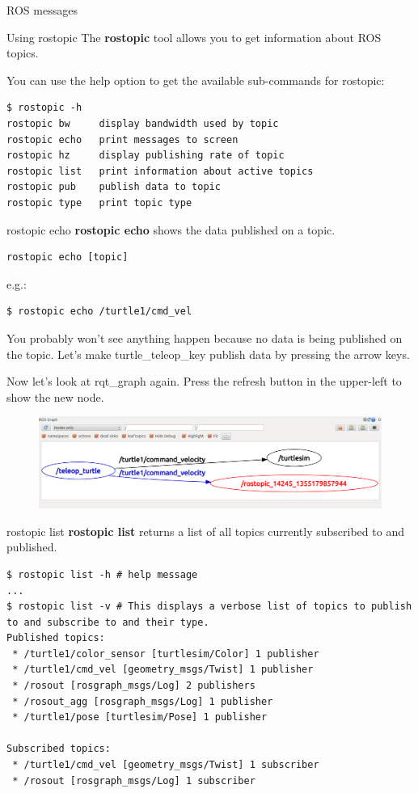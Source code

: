 \begin{frame}{ROS messages}
\end{frame}

\begin{frame}[fragile]{Using rostopic}
The \textbf{rostopic} tool allows you to get information about ROS topics. 

\vspace{.1cm}
You can use the help option to get the available sub-commands for rostopic:
\begin{lstlisting}[language=shell]
$ rostopic -h
rostopic bw     display bandwidth used by topic
rostopic echo   print messages to screen
rostopic hz     display publishing rate of topic    
rostopic list   print information about active topics
rostopic pub    publish data to topic
rostopic type   print topic type
\end{lstlisting}
\end{frame}

\begin{frame}[fragile]{rostopic echo}
\textbf{rostopic echo} shows the data published on a topic.
\begin{lstlisting}[language=syntax]
rostopic echo [topic]
\end{lstlisting}
e.g.:
\begin{lstlisting}[language=shell]
$ rostopic echo /turtle1/cmd_vel
\end{lstlisting}
You probably won't see anything happen because no data is being published on the topic. Let's make turtle\_teleop\_key publish data by pressing the arrow keys. 

\vspace{.1cm}
Now let's look at rqt\_graph again. Press the refresh button in the upper-left to show the new node.
\begin{figure}
\includegraphics[width=.8\textwidth]{./img/ros/rqt_graph_echo.png}
\end{figure}
\end{frame}

\begin{frame}[fragile]{rostopic list}
\textbf{rostopic list} returns a list of all topics currently subscribed to and published.

\begin{lstlisting}[language=shell]
$ rostopic list -h # help message
...
$ rostopic list -v # This displays a verbose list of topics to publish to and subscribe to and their type.
Published topics:
 * /turtle1/color_sensor [turtlesim/Color] 1 publisher
 * /turtle1/cmd_vel [geometry_msgs/Twist] 1 publisher
 * /rosout [rosgraph_msgs/Log] 2 publishers
 * /rosout_agg [rosgraph_msgs/Log] 1 publisher
 * /turtle1/pose [turtlesim/Pose] 1 publisher

Subscribed topics:
 * /turtle1/cmd_vel [geometry_msgs/Twist] 1 subscriber
 * /rosout [rosgraph_msgs/Log] 1 subscriber
\end{lstlisting}
\end{frame}

